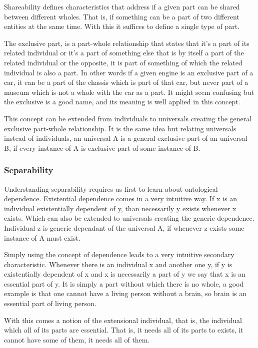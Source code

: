 Shareability defines characteristics that address if a given part can be shared between different wholes. That is, if something can be a part of two different entities at the same time. With this it suffices to define a single type of part. 

The exclusive part, is a part-whole relationship that states that it's a part of its related individual or it's a part of something else that is by itself a part of the related individual or the opposite, it is part of something of which the related individual is also a part. In other words if a given engine is an exclusive part of a car, it can be a part of the chassis which is part of that car, but never part of a museum which is not a whole with the car as a part. It might seem confusing but the exclusive is a good name, and its meaning is well applied in this concept.

This concept can be extended from individuals to universals creating the general exclusive part-whole relationship. It is the same idea but relating universals instead of individuals, an universal A is a general exclusive part of an universal B, if every instance of A is exclusive part of some instance of B.

\subsubsection{Separability}

Understanding separability requires us first to learn about ontological dependence. Existential dependence comes in a very intuitive way. If x is an individual existentially dependent of y, than necessarily y exists whenever x exists. Which can also be extended to universals creating the generic dependence. Individual z is generic dependant of the universal A, if whenever z exists some instance of A must exist.

Simply using the concept of dependence leads to a very intuitive secondary characteristic. Whenever there is an individual x and another one y, if y is existentially dependent of x and x is necessarily a part of y we say that x is an essential part of y. It is simply a part without which there is no whole, a good example is that one cannot have a living person without a brain, so brain is an essential part of living person. 

With this comes a notion of the extensional individual, that is, the individual which all of its parts are essential. That is, it needs all of its parts to exists, it cannot have some of them, it needs all of them.

